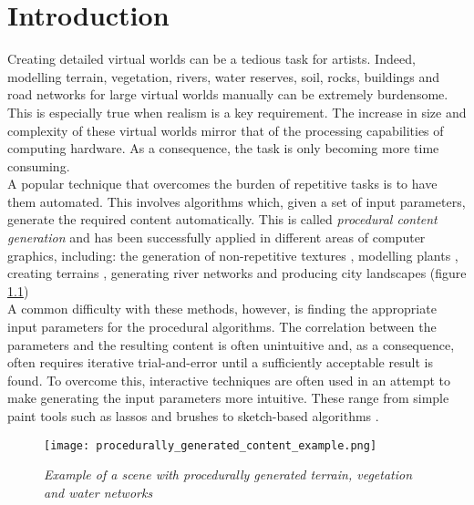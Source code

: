
\chapter{Introduction}
\par
Creating detailed virtual worlds can be a tedious task for artists. Indeed, modelling terrain, vegetation, rivers, water reserves, soil, rocks, buildings and road networks for large virtual worlds manually can be extremely burdensome. This is especially true when realism is a key requirement. The increase in size and complexity of these virtual worlds mirror that of the processing capabilities of computing hardware. As a consequence, the task is only becoming more time consuming.\\

A popular technique that overcomes the burden of repetitive tasks is to have them automated. This involves algorithms which, given a set of input parameters, generate the required content automatically. This is called \textit{procedural content generation} and has been successfully applied in different areas of computer graphics, including: the generation of non-repetitive textures \cite{Efros1999,Liang2001,Wei2009}, modelling plants \cite{Boudon2012,Fourcaud2008,Guo2011,Lewis1999}, creating terrains \cite{Smelik2009,Gain2009,Doran2010}, generating river networks \cite{Derzapf2011,Emilien} and producing city landscapes \cite{Gain,Kelly2007,Parish2001} (figure \ref{fig:procedrual_generated_content_examples}) \\
A common difficulty with these methods, however, is finding the appropriate input parameters for the procedural algorithms. The correlation between the parameters and the resulting content is often unintuitive and, as a consequence, often requires iterative trial-and-error until a sufficiently acceptable result is found. To overcome this, interactive techniques are often used in an attempt to make generating the input parameters more intuitive. These range from simple paint tools such as lassos and brushes \cite{Emilien} to sketch-based algorithms \cite{Gain2009}. \\

\begin{figure}[h]
  \centering
	\texttt{[image: procedurally\_generated\_content\_example.png]}
	\caption{\textit{Example of a scene with procedurally generated terrain, vegetation and water networks \cite{Emilien2014a} }}
	\label{fig:procedrual_generated_content_examples}
\end{figure}

